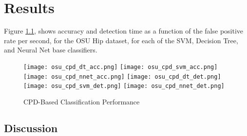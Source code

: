 \chapter{Results}
Figure \ref{fig:cpd_perf}, shows accuracy and detection time as a function of the
false positive rate per second, for the OSU Hip dataset,
for each of the SVM, Decision Tree, and Neural Net base classifiers.

\begin{figure}
 \centering
 \texttt{[image: osu\_cpd\_dt\_acc.png]}
 \texttt{[image: osu\_cpd\_svm\_acc.png]}
 \texttt{[image: osu\_cpd\_nnet\_acc.png]}
 \texttt{[image: osu\_cpd\_dt\_det.png]}
 \texttt{[image: osu\_cpd\_svm\_det.png]}
 \texttt{[image: osu\_cpd\_nnet\_det.png]}
 \caption{CPD-Based Classification Performance}
 \label{fig:cpd_perf}
\end{figure}

\section{Discussion}
